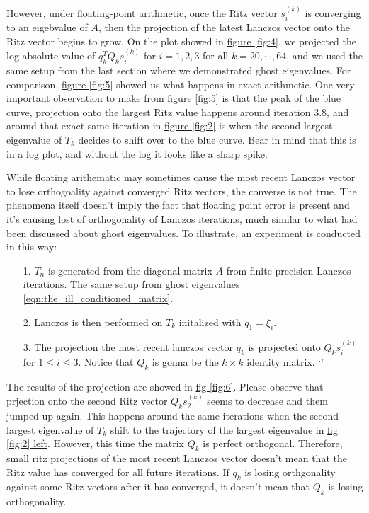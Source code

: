 \documentclass[]{article}
\theoremstyle{definition}
\begin{document}
            However, under floating-point arithmetic, once the Ritz vector $s_i^{(k)}$ is converging to an eigebvalue of $A$, then the projection of the latest Lanczos vector onto the Ritz vector begins to grow. On the plot showed in \hyperref[fig:4]{figure \ref*{fig:4}}, we projected the log absolute value of $q_k^TQ_ks_i^{(k)}$ for $i=1, 2, 3$ for all $k=20, \cdots, 64$, and we used the same setup from the last section where we demonstrated ghost eigenvalues. For comparison, \hyperref[fig:5]{figure \ref*{fig:5}} showed us what happens in exact arithmetic. One very important observation to make from \hyperref[fig:5]{figure \ref*{fig:5}} is that the peak of the blue curve, projection onto the largest Ritz value happens around iteration 3.8, and around that exact same iteration in \hyperref[fig:2]{figure \ref*{fig:2}} is when the second-largest eigenvalue of $T_k$ decides to shift over to the blue curve. Bear in mind that this is in a log plot, and without the log it looks like a sharp spike. 
            \par
            While floating arithematic may sometimes cause the most recent Lanczos vector to lose orthogoality against converged Ritz vectors, the converse is not true. The phenomena itself doesn't imply the fact that floating point error is present and it's causing lost of orthogonality of Lanczos iterations, much similar to what had been discussed about ghost eigenvalues. To illustrate, an experiment is conducted in this way: 
            \begin{enumerate}
                \item [1.] $T_n$ is generated from the diagonal matrix $A$ from finite precision Lanczos iterations. The same setup from \hyperref[eqn:the_ill_conditioned_matrix]{ghost eigenvalues \ref*{eqn:the_ill_conditioned_matrix}}. 
                \item [2.] Lanczos is then performed on $T_k$ initalized with $q_1 = \xi_i$. 
                \item [3.] The projection the most recent lanczos vector $q_k$ is projected onto $Q_ks_i^{(k)}$ for $1\le i \le 3$. Notice that $Q_k$ is gonna be the $k\times k$ identity matrix. `'
            \end{enumerate}
            The results of the projection are showed in \hyperref[fig:6]{fig \ref*{fig:6}}. Please observe that prjection onto the second Ritz vector $Q_ks_2^{(k)}$ seems to decrease and them jumped up again. This happens around the same iterations when the second largest eigenvalue of $T_k$ shift to the trajectory of the largest eigenvalue in \hyperref[fig:2]{fig \ref*{fig:2} left}. However, this time the matrix $Q_k$ is perfect orthogonal. Therefore, small ritz projections of the most recent Lanczos vector doesn't mean that the Ritz value has converged for all future iterations. If $q_k$ is losing orthgonality against some Ritz vectors after it has converged, it doesn't mean that $Q_k$ is losing orthogonality. 
\end{document}
